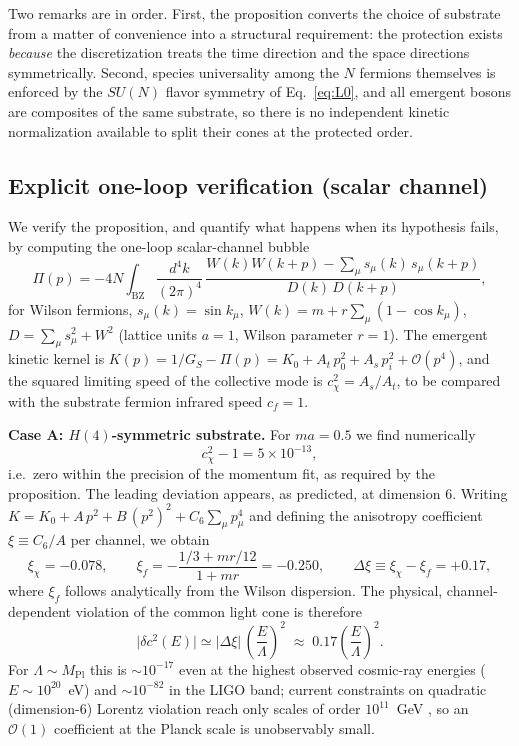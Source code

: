\documentclass[11pt,a4paper]{article}
\begin{document}
Two remarks are in order.
First, the proposition converts the choice of substrate from a
matter of convenience into a structural requirement: the protection
exists \emph{because} the discretization treats the time direction
and the space directions symmetrically.
Second, species universality among the $N$ fermions themselves is
enforced by the $SU(N)$ flavor symmetry of Eq.~\eqref{eq:L0}, and
all emergent bosons are composites of the same substrate, so there
is no independent kinetic normalization available to split their
cones at the protected order.

\subsection{Explicit one-loop verification (scalar channel)}

We verify the proposition, and quantify what happens when its
hypothesis fails, by computing the one-loop scalar-channel bubble
\begin{equation}
\Pi(p) = -4N \int_{\mathrm{BZ}} \frac{d^4k}{(2\pi)^4}\,
\frac{W(k)W(k+p) - \sum_\mu s_\mu(k)\,s_\mu(k+p)}
{D(k)\,D(k+p)},
\label{eq:bubble}
\end{equation}
for Wilson fermions, $s_\mu(k) = \sin k_\mu$,
$W(k) = m + r\sum_\mu(1 - \cos k_\mu)$,
$D = \sum_\mu s_\mu^2 + W^2$ (lattice units $a = 1$, Wilson
parameter $r = 1$).
The emergent kinetic kernel is
$K(p) = 1/G_S - \Pi(p) = K_0 + A_t\,p_0^2 + A_s\,p_i^2
+ \mathcal{O}(p^4)$, and the squared limiting speed of the
collective mode is $c_\chi^2 = A_s/A_t$, to be compared with the
substrate fermion infrared speed $c_f = 1$.

\textbf{Case A: $H(4)$-symmetric substrate.}
For $ma = 0.5$ we find numerically
\begin{equation}
c_\chi^2 - 1 = 5\times 10^{-13},
\end{equation}
i.e.\ zero within the precision of the momentum fit, as required by
the proposition.
The leading deviation appears, as predicted, at dimension 6.
Writing $K = K_0 + A\,p^2 + B\,(p^2)^2 + C_6\sum_\mu p_\mu^4$ and
defining the anisotropy coefficient $\xi \equiv C_6/A$ per channel,
we obtain
\begin{equation}
\xi_\chi = -0.078, \qquad
\xi_f = -\frac{1/3 + mr/12}{1 + mr} = -0.250, \qquad
\Delta\xi \equiv \xi_\chi - \xi_f = +0.17,
\end{equation}
where $\xi_f$ follows analytically from the Wilson dispersion.
The physical, channel-dependent violation of the common light cone
is therefore
\begin{equation}
\bigl|\delta c^2(E)\bigr| \simeq |\Delta\xi|\,
\left(\frac{E}{\Lambda}\right)^2
\;\approx\; 0.17\left(\frac{E}{\Lambda}\right)^2 .
\label{eq:dc-dim6}
\end{equation}
For $\Lambda \sim M_{\mathrm{Pl}}$ this is
$\sim 10^{-17}$ even at the highest observed cosmic-ray energies
($E \sim 10^{20}$~eV) and $\sim 10^{-82}$ in the LIGO band;
current constraints on quadratic (dimension-6) Lorentz violation
reach only scales of order $10^{11}$~GeV \cite{Liberati:2013xla},
so an $\mathcal{O}(1)$ coefficient at the Planck scale is
unobservably small.
\end{document}
